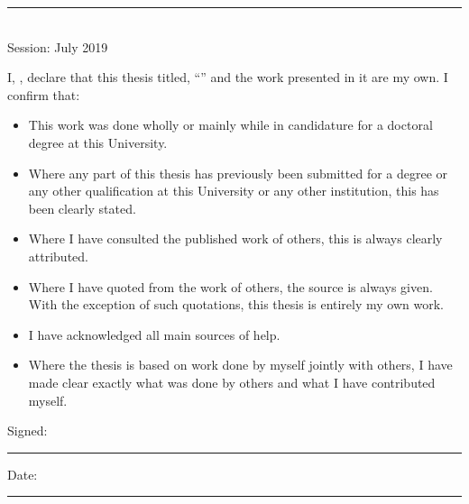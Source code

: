 \documentclass[b5paper, 12pt, openany, twoside, titlepage]{book} %
\begin{document}
\begin{titlepage}
\begin{small}
{{				
				\bigskip


			}}
		\bigskip\bigskip\bigskip\bigskip

		\begin{center}
			\rule{4cm}{1pt}\\
			Session: July 2019\\
		\end{center}
	\end{small}
\end{titlepage}

\pagestyle{empty}%
\cleardoublepage

\makeatletter
\noindent I, \@author, declare that this thesis titled, \enquote{\@title} and the work presented in it are my own. I confirm that:
\makeatother

\begin{itemize}
	\item This work was done wholly or mainly while in candidature for a doctoral degree at this University.
	\item Where any part of this thesis has previously been submitted for a degree or any other qualification at this University or any other institution, this has been clearly stated.
	\item Where I have consulted the published work of others, this is always clearly attributed.
	\item Where I have quoted from the work of others, the source is always given. With the exception of such quotations, this thesis is entirely my own work.
	\item I have acknowledged all main sources of help.
	\item Where the thesis is based on work done by myself jointly with others, I have made clear exactly what was done by others and what I have contributed myself.
\end{itemize}

\bigskip\bigskip

\noindent Signed:\\
\rule[0.5em]{25em}{0.5pt} %

\bigskip

\noindent Date:\\
\rule[0.5em]{25em}{0.5pt} %

\cleardoublepage

%
\end{document}
